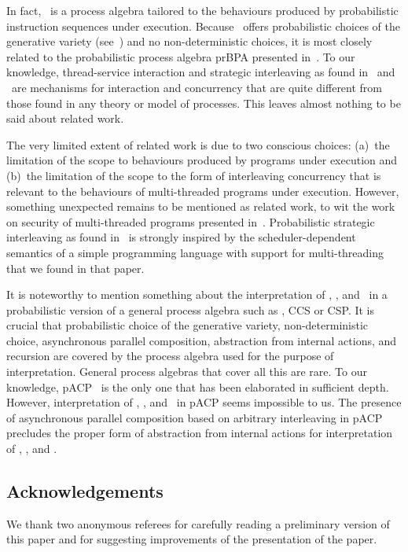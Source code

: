 \documentclass{llncs}
\begin{document}
In fact, \prBTA\ is a process algebra tailored to the behaviours 
produced by probabilistic instruction sequences under execution.
Because \prBTA\ offers probabilistic choices of the generative variety 
(see~\cite{GSS95a}) and no non-deterministic choices, it is most closely 
related to the probabilistic process algebra prBPA presented 
in~\cite{BBS95a}.
To our knowledge, thread-service interaction and strategic interleaving 
as found in \prTSI\ and \prTA\ are mechanisms for interaction and 
concurrency that are quite different from those found in any theory or 
model of processes.
This leaves almost nothing to be said about related work.

The very limited extent of related work is due to two conscious choices:
(a)~the limitation of the scope to behaviours produced by programs under 
execution and
(b)~the limitation of the scope to the form of interleaving concurrency 
that is relevant to the behaviours of multi-threaded programs under 
execution.
However, something unexpected remains to be mentioned as related work, 
to wit the work on security of multi-threaded programs presented 
in~\cite{SS00a}.
Probabilistic strategic interleaving as found in \prTA\ is strongly 
inspired by the scheduler-dependent semantics of a simple programming 
language with support for multi-threading that we found in that paper.

It is noteworthy to mention something about the interpretation of 
\prBTA, \prTSI, and \prTA\ in a probabilistic version of a general 
process algebra such as \ACP, CCS or CSP.
It is crucial that probabilistic choice of the generative variety, 
non-deterministic choice, asynchronous parallel composition, abstraction 
from internal actions, and recursion are covered by the process algebra
used for the purpose of interpretation.
General process algebras that cover all this are rare.
To our knowledge, pACP~\cite{AG09a} is the only one that has been 
elaborated in sufficient depth.
However, interpretation of \prBTA, \prTSI, and \prTA\ in pACP 
seems impossible to us.
The presence of asynchronous parallel composition based on arbitrary 
interleaving in pACP precludes the proper form of abstraction 
from internal actions for interpretation of \prBTA, \prTSI, and \prTA. 

\subsection*{Acknowledgements}

We thank two anonymous referees for carefully reading a preliminary
version of this paper and for suggesting improvements of the
presentation of the paper.
\end{document}
